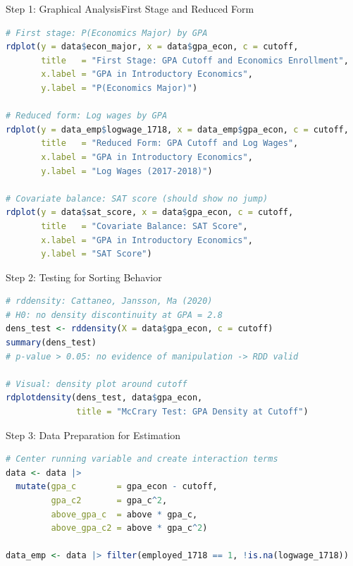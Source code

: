 \documentclass[dvipsnames,hyperref={pdfpagelabels=false}]{beamer}
\begin{document}
\begin{frame}[fragile]{Step 1: Graphical Analysis}{First Stage and Reduced Form}
\begin{lstlisting}[language=R]
# First stage: P(Economics Major) by GPA
rdplot(y = data$econ_major, x = data$gpa_econ, c = cutoff,
       title   = "First Stage: GPA Cutoff and Economics Enrollment",
       x.label = "GPA in Introductory Economics",
       y.label = "P(Economics Major)")

# Reduced form: Log wages by GPA
rdplot(y = data_emp$logwage_1718, x = data_emp$gpa_econ, c = cutoff,
       title   = "Reduced Form: GPA Cutoff and Log Wages",
       x.label = "GPA in Introductory Economics",
       y.label = "Log Wages (2017-2018)")

# Covariate balance: SAT score (should show no jump)
rdplot(y = data$sat_score, x = data$gpa_econ, c = cutoff,
       title   = "Covariate Balance: SAT Score",
       x.label = "GPA in Introductory Economics",
       y.label = "SAT Score")
\end{lstlisting}
\end{frame}


\begin{frame}[fragile]{Step 2: Testing for Sorting Behavior}
\begin{lstlisting}[language=R]
# rddensity: Cattaneo, Jansson, Ma (2020)
# H0: no density discontinuity at GPA = 2.8
dens_test <- rddensity(X = data$gpa_econ, c = cutoff)
summary(dens_test)
# p-value > 0.05: no evidence of manipulation -> RDD valid

# Visual: density plot around cutoff
rdplotdensity(dens_test, data$gpa_econ,
              title = "McCrary Test: GPA Density at Cutoff")
\end{lstlisting}
\end{frame}


\begin{frame}[fragile]{Step 3: Data Preparation for Estimation}
\begin{lstlisting}[language=R]
# Center running variable and create interaction terms
data <- data |>
  mutate(gpa_c        = gpa_econ - cutoff,
         gpa_c2       = gpa_c^2,
         above_gpa_c  = above * gpa_c,
         above_gpa_c2 = above * gpa_c^2)

data_emp <- data |> filter(employed_1718 == 1, !is.na(logwage_1718))
\end{lstlisting}
\end{frame}
\end{document}
